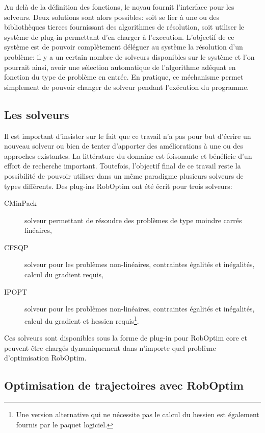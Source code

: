 Au delà de la définition des fonctions, le noyau fournit l'interface
pour les solveurs. Deux solutions sont alors possibles: soit se lier à
une ou des bibliothèques tierces fournissant des algorithmes de
résolution, soit utiliser le système de plug-in
permettant d'en charger à l'execution. L'objectif de ce système est de
pouvoir complètement déléguer au système la résolution d'un problème:
il y a un certain nombre de solveurs disponibles sur le système et
l'on pourrait ainsi, avoir une sélection automatique de l'algorithme
adéquat en fonction du type de problème en entrée. En pratique, ce
méchanisme permet simplement de pouvoir changer de solveur pendant
l'exécution du programme.


\subsection{Les solveurs}


Il est important d'insister sur le fait que ce travail n'a pas pour
but d'écrire un nouveau solveur ou bien de tenter d'apporter des
améliorations à une ou des approches existantes. La littérature du
domaine est foisonante et bénéficie d'un effort de recherche
important. Toutefois, l'objectif final de ce travail reste la
possibilité de pouvoir utiliser dans un même paradigme plusieurs
solveurs de types différents. Des plug-ins RobOptim ont été écrit pour
trois solveurs:
%
\begin{description}
\item[CMinPack] solveur permettant de résoudre des problèmes de type
  moindre carrés linéaires,
\item[CFSQP] solveur pour les problèmes non-linéaires, contraintes
  égalités et inégalités, calcul du gradient requis,
\item[IPOPT] solveur pour les problèmes non-linéaires, contraintes
  égalités et inégalités, calcul du gradient et hessien
  requis\footnote{Une version alternative qui ne nécessite pas le
    calcul du hessien est également fournis par le paquet logiciel.}.
\end{description}

Ces solveurs sont disponibles sous la forme de plug-in pour RobOptim
core et peuvent être chargés dynamiquement dans n'importe quel
problème d'optimisation RobOptim.


\subsection{Optimisation de trajectoires avec RobOptim}

